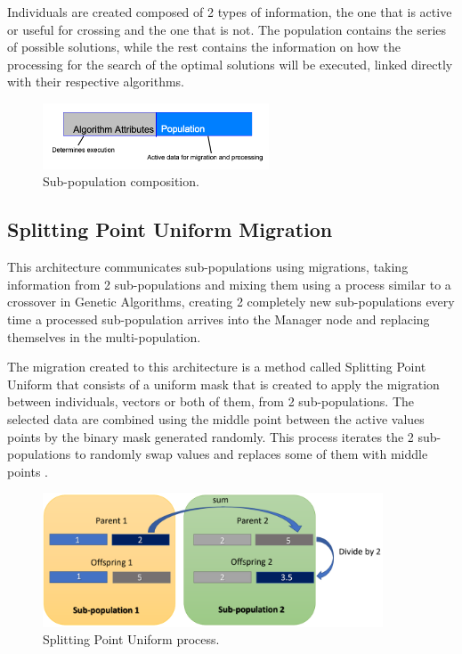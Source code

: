 \documentclass[runningheads]{llncs}
\begin{document}
Individuals are created composed of 2 types of information, the one that is
active or useful for crossing and the one that is not. The population contains
the series of possible solutions, while the rest contains the information on how
the processing for the search of the optimal solutions will be executed, linked
directly with their respective algorithms.

\begin{figure}[htp]
  \centering
  \includegraphics[width=0.6\textwidth]{img/subpopulationDefinition.png}
  \caption{Sub-population composition.} \label{fig3}
  \end{figure}

\subsection{Splitting Point Uniform Migration}

This architecture communicates sub-populations using migrations, taking information from 2 sub-populations and mixing them 
using a process similar to a crossover in Genetic Algorithms, creating 2 completely new sub-populations
every time a processed sub-population arrives into the Manager node and replacing themselves in the multi-population.

The migration created to this architecture is a method called Splitting Point Uniform that consists of a uniform mask that is created to apply the migration between individuals, vectors or both of them, from 2
sub-populations. The selected data are combined using the middle point between
the active values points by the binary mask generated randomly. This process iterates the 2 sub-populations to
randomly swap values and replaces some of them with middle points \cite{Kramer2017,Kaya2011}.


\begin{figure}[htp]
  \centering
  \includegraphics[width=0.9\textwidth]{img/splittinPointUniform.png}
  \caption{Splitting Point Uniform process.} \label{fig4}
  \end{figure}
\end{document}

